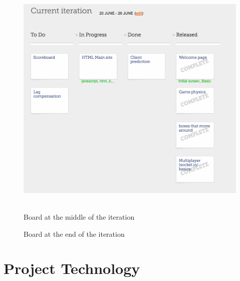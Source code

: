 \documentclass{article}
\renewcommand{\_}{\char`_}
\begin{document}
\begin{figure}[h!]
                \hbox{%
                        \includegraphics[height=\ht0]{end}%
                }%
        \fi
        \noindent
        \parbox{.45\textwidth}{%
                \centering
                \caption{Board at the middle of the iteration}
                \label{fg:middle}
        }%
        \hfil
        \parbox{.45\textwidth}{%
                \centering
                \caption{Board at the end of the iteration}
                \label{fg:end}
        }%
\end{figure}


\section{Project Technology}



\end{document}
